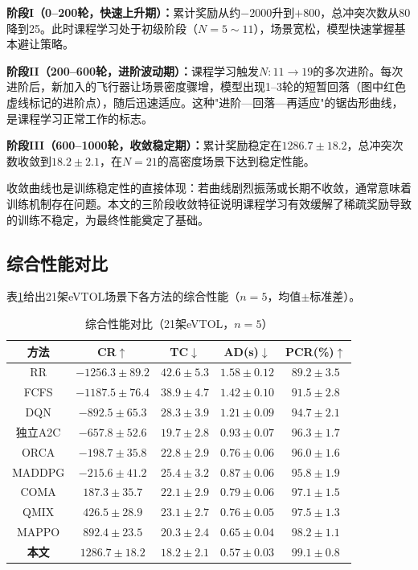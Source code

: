\documentclass[12pt,a4paper,UTF8]{ctexart}
\begin{document}
\textbf{阶段I（0--200轮，快速上升期）：}累计奖励从约$-2000$升到$+800$，总冲突次数从80降到25。此时课程学习处于初级阶段（$N=5\sim11$），场景宽松，模型快速掌握基本避让策略。

\textbf{阶段II（200--600轮，进阶波动期）：}课程学习触发$N:11\to19$的多次进阶。每次进阶后，新加入的飞行器让场景密度骤增，模型出现1--3轮的短暂回落（图中红色虚线标记的进阶点），随后迅速适应。这种"进阶—回落—再适应"的锯齿形曲线，是课程学习正常工作的标志。

\textbf{阶段III（600--1000轮，收敛稳定期）：}累计奖励稳定在$1286.7\pm18.2$，总冲突次数收敛到$18.2\pm2.1$，在$N=21$的高密度场景下达到稳定性能。

收敛曲线也是训练稳定性的直接体现：若曲线剧烈振荡或长期不收敛，通常意味着训练机制存在问题。本文的三阶段收敛特征说明课程学习有效缓解了稀疏奖励导致的训练不稳定，为最终性能奠定了基础。

\subsection{综合性能对比}

表\ref{tab:comparison}给出21架eVTOL场景下各方法的综合性能（$n=5$，均值$\pm$标准差）。

\begin{table}[H]
    \centering
    \caption{综合性能对比（21架eVTOL，$n=5$）}
    \label{tab:comparison}
    \begin{tabular}{|c|c|c|c|c|}
        \hline
        \textbf{方法} & \textbf{CR$\uparrow$} & \textbf{TC$\downarrow$} & \textbf{AD(s)$\downarrow$} & \textbf{PCR(\%)$\uparrow$} \\
        \hline
        RR & $-1256.3\pm89.2$ & $42.6\pm5.3$ & $1.58\pm0.12$ & $89.2\pm3.5$ \\
        FCFS & $-1187.5\pm76.4$ & $38.9\pm4.7$ & $1.42\pm0.10$ & $91.5\pm2.8$ \\
        DQN & $-892.5\pm65.3$ & $28.3\pm3.9$ & $1.21\pm0.09$ & $94.7\pm2.1$ \\
        独立A2C & $-657.8\pm52.6$ & $19.7\pm2.8$ & $0.93\pm0.07$ & $96.3\pm1.7$ \\
        ORCA & $-198.7\pm35.8$ & $22.8\pm2.9$ & $0.76\pm0.06$ & $96.0\pm1.6$ \\
        MADDPG & $-215.6\pm41.2$ & $25.4\pm3.2$ & $0.87\pm0.06$ & $95.8\pm1.9$ \\
        COMA & $187.3\pm35.7$ & $22.1\pm2.9$ & $0.79\pm0.06$ & $97.1\pm1.5$ \\
        QMIX & $426.5\pm28.9$ & $23.1\pm2.7$ & $0.76\pm0.05$ & $97.5\pm1.3$ \\
        MAPPO & $892.4\pm23.5$ & $20.3\pm2.4$ & $0.65\pm0.04$ & $98.2\pm1.1$ \\
        \textbf{本文} & $\mathbf{1286.7\pm18.2}$ & $\mathbf{18.2\pm2.1}$ & $\mathbf{0.57\pm0.03}$ & $\mathbf{99.1\pm0.8}$ \\
        \hline
    \end{tabular}
\end{table}
\end{document}
